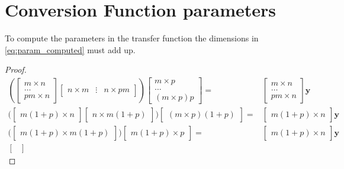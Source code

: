 \section{Conversion Function parameters} %
\label{sec:conversion_function_parameters}
To compute the parameters in the transfer function the dimensions in \eqref{eq:param_computed} must add up.
\begin{proof}
\begin{equation*}
	\begin{split}
		\left(  
	\begin{bmatrix}
		m \times n \\
		\dots \\
		pm \times n
	\end{bmatrix}
	\begin{bmatrix}
		n \times m & \vdots & n\times pm
	\end{bmatrix} \right)
	\begin{bmatrix}
		m \times p \\
		\dots \\
		\left(  m \times p \right) p
	\end{bmatrix}
	= & 
	\begin{bmatrix}
		m \times n \\
		\dots \\
		pm \times n
	\end{bmatrix} \mathbf{y}\\ %
	\biggl( \begin{bmatrix}
		m(1+p) \times n 
	\end{bmatrix}
	\begin{bmatrix}
		n \times m(1+p)
	\end{bmatrix} \biggr) 
	\begin{bmatrix}
		\left(  m \times p \right) (1+p)
	\end{bmatrix}
	= & 
	\begin{bmatrix}
		m(1+p) \times n 
	\end{bmatrix} \mathbf{y} \\ %
	\biggl( \begin{bmatrix}
		m(1+p) \times  m(1+p)
	\end{bmatrix} \biggr) 
	\begin{bmatrix}
		m (1+p) \times p 
	\end{bmatrix}
	= &
	\begin{bmatrix}
		m(1+p) \times n 
	\end{bmatrix} \mathbf{y} \\ %
	\begin{bmatrix}

\end{bmatrix}
\end{split}
\end{equation*}
\end{proof}
